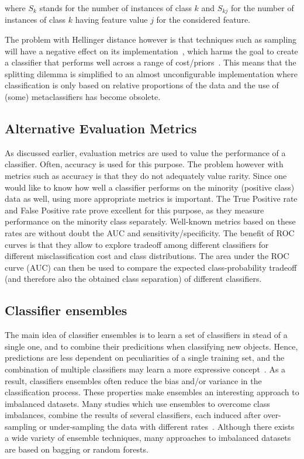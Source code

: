 where \(S_k\) stands for the number of instances of class \(k\) and \(S_{kj}\) for the number of instances of class \(k\) having feature value \(j\) for the considered feature.

The problem with Hellinger distance however is that techniques such as sampling will have a negative effect on its implementation~\cite{mccarthy}, which harms the goal to create a classifier that performs well across a range of cost/priors~\cite{Chawla04editorial:special}.  This means that the splitting dilemma is simplified to an almost unconfigurable implementation where classification is only based on relative proportions of the data and the use of (some) metaclassifiers has become obsolete.

\subsection{Alternative Evaluation Metrics}\label{app-eval-metric}
As discussed earlier, evaluation metrics are used to value the performance of a classifier. Often, accuracy is used for this purpose. The problem however with metrics such as accuracy is that they do not adequately value rarity. Since one would like to know how well a classifier performs on the minority (positive class) data as well, using more appropriate metrics is important. The True Positive rate and False Positive rate prove excellent for this purpose, as they measure performance on the minority class separately. Well-known metrics based on these rates are without doubt the AUC and sensitivity/specificity. The benefit of ROC curves is that they allow to explore tradeoff among different classifiers for different misclassification cost and class distributions. The area under the ROC curve (AUC) can then be used to compare the expected class-probability tradeoff (and therefore also the obtained class separation) of different classifiers. 


\subsection{Classifier ensembles}\label{classif-ensembles}
The main idea of classifier ensembles is to learn a set of classifiers in stead of a single one, and to combine their predicitions when classifying new objects. Hence, predictions are less dependent on peculiarities of a single training set, and the combination of multiple classifiers may learn a more expressive concept~\cite{DietterichEnsemble02}. As a result, classifiers ensembles often reduce the bias and/or variance in the classification process.  These properties make ensembles an interesting approach to imbalanced datasets. Many studies which use ensembles to overcome class imbalances, combine the results of several classifiers, each induced after over-sampling or under-sampling the data with different rates~\cite{garcia}. Although there exists a wide variety of ensemble techniques, many approaches to imbalanced datasets are based on bagging or random forests.


